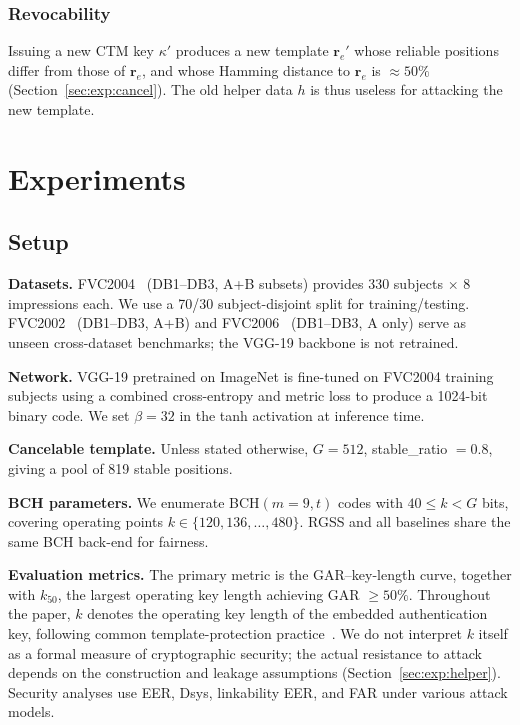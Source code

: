 \documentclass[journal]{IEEEtran}
\begin{document}
\subsubsection{Revocability}

Issuing a new CTM key $\kappa'$ produces a new template
$\mathbf{r}_{e}'$ whose reliable positions differ from those of
$\mathbf{r}_e$, and whose Hamming distance to $\mathbf{r}_e$ is
$\approx 50\%$ (Section~\ref{sec:exp:cancel}).
The old helper data $h$ is thus useless for attacking the new template.

\section{Experiments}
\label{sec:exp}

\subsection{Setup}
\label{sec:exp:setup}

\noindent\textbf{Datasets.}
FVC2004~\cite{fvc2004} (DB1--DB3, A+B subsets) provides 330 subjects
$\times$ 8 impressions each.
We use a 70/30 subject-disjoint split for training/testing.
FVC2002~\cite{fvc2002} (DB1--DB3, A+B) and FVC2006~\cite{fvc2006}
(DB1--DB3, A only) serve as unseen cross-dataset benchmarks;
the VGG-19 backbone is not retrained.

\noindent\textbf{Network.}
VGG-19 pretrained on ImageNet is fine-tuned on FVC2004 training
subjects using a combined cross-entropy and metric loss to produce
a 1024-bit binary code.
We set $\beta=32$ in the tanh activation at inference time.

\noindent\textbf{Cancelable template.}
Unless stated otherwise, $G=512$, stable\_ratio $= 0.8$, giving
a pool of 819 stable positions.

\noindent\textbf{BCH parameters.}
We enumerate BCH$(m=9,t)$ codes with $40 \le k < G$ bits,
covering operating points $k \in \{120, 136, \ldots, 480\}$.
RGSS and all baselines share the same BCH back-end for fairness.

\noindent\textbf{Evaluation metrics.}
The primary metric is the GAR--key-length curve, together with
$k_{50}$, the largest operating key length achieving GAR $\ge 50\%$.
Throughout the paper, $k$ denotes the operating key length of the
embedded authentication key, following common template-protection
practice~\cite{talreja2021deep}.
We do not interpret $k$ itself as a formal measure of cryptographic
security; the actual resistance to attack depends on the construction
and leakage assumptions (Section~\ref{sec:exp:helper}).
Security analyses use EER, Dsys, linkability EER, and FAR
under various attack models.
\end{document}
